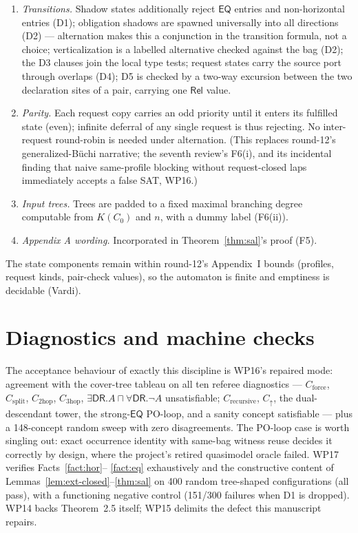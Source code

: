 \documentclass[11pt]{article}
\theoremstyle{definition}
\newcommand{\EQ}{\mathsf{EQ}}
\newcommand{\DR}{\mathsf{DR}}
\newcommand{\Rel}{\mathsf{Rel}}
\begin{document}
\begin{enumerate}[label=(\alph*),leftmargin=2em]
\item \emph{Transitions.}  Shadow states additionally reject $\EQ$
entries and non-horizontal entries (D1); obligation shadows are spawned
universally into all directions (D2) --- alternation makes this a
conjunction in the transition formula, not a choice; verticalization is
a labelled alternative checked against the bag (D2); the D3 clauses join
the local type tests; request states carry the source port through
overlaps (D4); D5 is checked by a two-way excursion between the two
declaration sites of a pair, carrying one $\Rel$ value.
\item \emph{Parity.}  Each request copy carries an odd priority until it
enters its fulfilled state (even); infinite deferral of any single
request is thus rejecting.  No inter-request round-robin is needed under
alternation.  (This replaces round-12's generalized-B\"uchi narrative;
the seventh review's F6(i), and its incidental finding that naive
same-profile blocking without request-closed laps immediately accepts a
false SAT, WP16.)
\item \emph{Input trees.}  Trees are padded to a fixed maximal branching
degree computable from $K(C_0)$ and $n$, with a dummy label (F6(ii)).
\item \emph{Appendix A wording.}  Incorporated in
Theorem~\ref{thm:sal}'s proof (F5).
\end{enumerate}

The state components remain within round-12's Appendix~I bounds
(profiles, request kinds, pair-check values), so the automaton is finite
and emptiness is decidable (Vardi).

\section{Diagnostics and machine checks}\label{sec:diag}

The acceptance behaviour of exactly this discipline is WP16's repaired
mode: agreement with the cover-tree tableau on all ten referee
diagnostics --- $C_{\mathrm{force}}$, $C_{\mathrm{split}}$,
$C_{\mathrm{2hop}}$, $C_{\mathrm{3hop}}$,
$\exists\DR.A\sqcap\forall\DR.\lnot A$ unsatisfiable;
$C_{\mathrm{recursive}}$, $C_\uparrow$, the dual-descendant tower, the
strong-$\EQ$ PO-loop, and a sanity concept satisfiable --- plus a
148-concept random sweep with zero disagreements.  The PO-loop case is
worth singling out: exact occurrence identity with same-bag witness
reuse decides it correctly by design, where the project's retired
quasimodel oracle failed.  WP17 verifies Facts~\ref{fact:hor}--%
\ref{fact:eq} exhaustively and the constructive content of
Lemmas~\ref{lem:ext-closed}--\ref{thm:sal} on 400 random tree-shaped
configurations (all pass), with a functioning negative control (151/300
failures when D1 is dropped).  WP14 backs Theorem~2.5 itself; WP15
delimits the defect this manuscript repairs.
\end{document}
